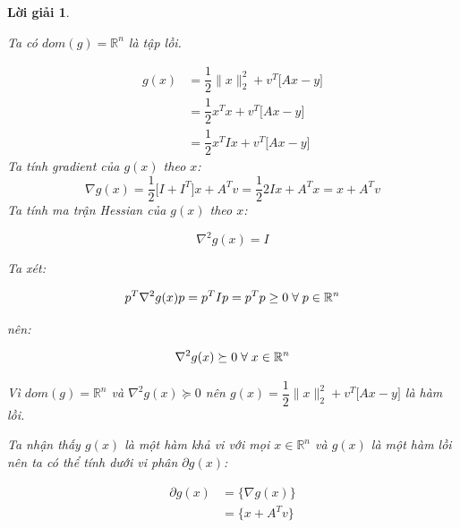 \documentclass[14pt, a4paper]{article}
\theoremstyle{sltheorem}
\theoremstyle{soltheorem}
\newtheorem*{loigiai}{Lời giải}
\begin{document}
\begin{loigiai}
\begin{enumerate} [wide, labelwidth=!, labelindent=0pt,label=\textbf{\arabic*}.]
            Ta có $dom(g)= \mathbb{R}^n$ là tập lồi.

            \begin{equation*}
                \begin{aligned}
                    g(x) &= \dfrac{1}{2} \lVert x \rVert_2^2 + v^T\Big \lbrack Ax - y \Big \rbrack \\
                    &=\dfrac{1}{2}x^T x + v^T\Big \lbrack Ax - y \Big \rbrack \\
                    &= \dfrac{1}{2}x^T I x + v^T\Big \lbrack Ax - y \Big \rbrack
                \end{aligned}
            \end{equation*}
            Ta tính gradient của $g(x)$ theo $x$:
            \begin{equation*}
                \nabla g(x) = \dfrac{1}{2} \Big \lbrack I + I^T \Big \rbrack x + A^T v = \dfrac{1}{2}2I x + A^T x = x + A^T v
            \end{equation*}
            Ta tính ma trận Hessian của $g(x)$ theo $x$:

            \begin{equation*}
                \nabla^2 g(x) = I
            \end{equation*}

            Ta xét:

            \begin{equation*}
                p^T \nabla^2 g(x) p = p^T I p = p^T p \geq 0 \thickspace \forall \thickspace p \in \mathbb{R}^n
            \end{equation*}

            nên:

            \begin{equation*}
                \nabla^2 g(x) \succeq 0 \thickspace \forall \thickspace x \in \mathbb{R}^n
            \end{equation*}

            Vì $dom(g)=\mathbb{R}^n$ và $\nabla^2 g(x) \succeq 0$ nên $g(x) = \dfrac{1}{2} \lVert x \rVert_2^2 + v^T\Big \lbrack Ax - y \Big \rbrack$ là hàm lồi.

            Ta nhận thấy $g(x)$ là một hàm khả vi với mọi $x \in \mathbb{R}^n$ và $g(x)$ là một hàm lồi nên ta có thể tính dưới vi phân $\partial g(x)$:

            \begin{equation*}
                \begin{aligned}
                    \partial g(x) &= \lbrace \nabla g(x) \rbrace \\
                    &= \lbrace x + A^T v \rbrace
                \end{aligned}
            \end{equation*}


\end{enumerate}
\end{loigiai}
\end{document}
